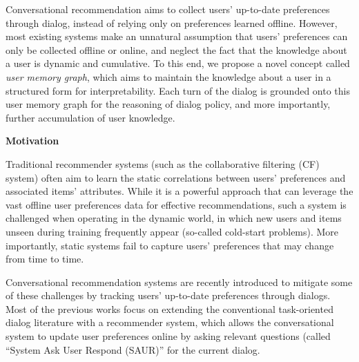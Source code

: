 Conversational recommendation aims to collect users' up-to-date preferences through dialog, instead of relying only on preferences learned offline.
However, most existing systems make an unnatural assumption that users' preferences can only be collected offline or online, and neglect the fact that the knowledge about a user is dynamic and cumulative.
To this end, we propose a novel concept called \textit{user memory graph}, which aims to maintain the knowledge about a user in a structured form for interpretability.
Each turn of the dialog is grounded onto this user memory graph for the reasoning of dialog policy, and more importantly, further accumulation of user knowledge.

\textbf{Motivation}

Traditional recommender systems (such as the collaborative filtering (CF) system) often aim to learn the static correlations between users' preferences and associated items' attributes.
While it is a powerful approach that can leverage the vast offline user preferences data for effective recommendations, such a system is challenged when operating in the dynamic world, in which new users and items unseen during training frequently appear (so-called cold-start problems).
More importantly, static systems fail to capture users' preferences that may change from time to time.


Conversational recommendation systems \cite{li2018towards} are recently introduced to mitigate some of these challenges by tracking users' up-to-date preferences through dialogs.
Most of the previous works focus on extending the conventional task-oriented dialog literature with a recommender system, which allows the conversational system to update user preferences online by asking relevant questions (called ``System Ask User Respond (SAUR)'' for the current dialog.


